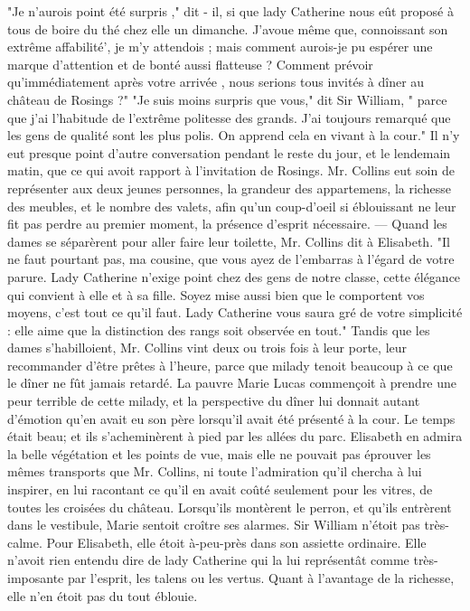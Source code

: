 "Je n'aurois point été surpris ," dit - il, si que lady Catherine nous eût proposé à tous de boire du thé chez elle un dimanche. J'avoue même que, connoissant son extrême affabilité', je m'y attendois ; mais comment aurois-je pu espérer une marque d'attention et de bonté aussi flatteuse ? Comment prévoir qu'immédiatement après votre arrivée , nous serions tous invités à dîner au château de Rosings ?"
"Je suis moins surpris que vous," dit Sir William, " parce que j'ai l'habitude de l'extrême politesse des grands. J'ai toujours remarqué\setcounter{page}{529} que les gens de qualité sont les plus polis. On apprend cela en vivant à la cour."
Il n'y eut presque point d'autre conversation pendant le reste du jour, et le lendemain matin, que ce qui avoit rapport à l'invitation de Rosings. Mr. Collins eut soin de représenter aux deux jeunes personnes, la grandeur des appartemens, la richesse des meubles, et le nombre des valets, afin qu'un coup-d'oeil si éblouissant ne leur fit pas perdre au premier moment, la présence d'esprit nécessaire. — Quand les dames se séparèrent pour aller faire leur toilette, Mr. Collins dit à Elisabeth. "Il ne faut pourtant pas, ma cousine, que vous ayez de l'embarras à l'égard de votre parure. Lady Catherine n'exige point chez des gens de notre classe, cette élégance qui convient à elle et à sa fille. Soyez mise aussi bien que le comportent vos moyens, c'est tout ce qu'il faut. Lady Catherine vous saura gré de votre simplicité : elle aime que la distinction des rangs soit observée en tout."
Tandis que les dames s'habilloient, Mr. Collins vint deux ou trois fois à leur porte, leur recommander d'être prêtes à l'heure, parce que milady tenoit beaucoup à ce que le dîner ne fût jamais retardé. La pauvre Marie Lucas commençoit à prendre une\setcounter{page}{530} peur terrible de cette milady, et la perspective du dîner lui donnait autant d'émotion qu'en avait eu son père lorsqu'il avait été présenté à la cour.
Le temps était beau; et ils s'acheminèrent à pied par les allées du parc. Elisabeth en admira la belle végétation et les points de vue, mais elle ne pouvait pas éprouver les mêmes transports que Mr. Collins, ni toute l'admiration qu'il chercha à lui inspirer, en lui racontant ce qu'il en avait coûté seulement pour les vitres, de toutes les croisées du château.
Lorsqu'ils montèrent le perron, et qu'ils entrèrent dans le vestibule, Marie sentoit croître ses alarmes. Sir William n'étoit pas très-calme. Pour Elisabeth, elle étoit à-peu-près dans son assiette ordinaire. Elle n'avoit rien entendu dire de lady Catherine qui la lui représentât comme très-imposante par l'esprit, les talens ou les vertus. Quant à l'avantage de la richesse, elle n'en étoit pas du tout éblouie.
